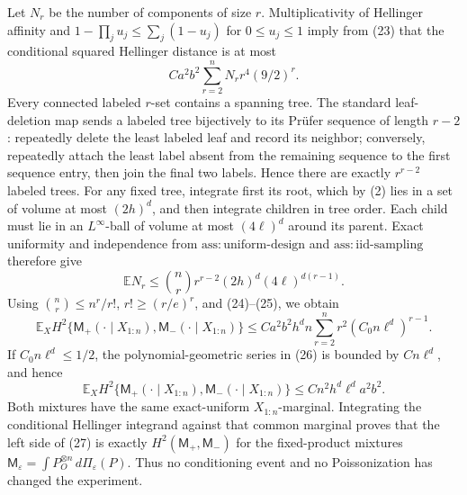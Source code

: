 Let \(N_r\) be the number of components of size \(r\).  Multiplicativity of Hellinger affinity and \(1-\prod_j u_j\le\sum_j(1-u_j)\) for \(0\le u_j\le1\) imply from (23) that the conditional squared Hellinger distance is at most
\[
 Ca^2b^2\sum_{r=2}^n N_r r^4(9/2)^r.                            \tag{24}
\]
Every connected labeled \(r\)-set contains a spanning tree.  The standard leaf-deletion map sends a labeled tree bijectively to its Pr\"ufer sequence of length \(r-2\): repeatedly delete the least labeled leaf and record its neighbor; conversely, repeatedly attach the least label absent from the remaining sequence to the first sequence entry, then join the final two labels.  Hence there are exactly \(r^{r-2}\) labeled trees.  For any fixed tree, integrate first its root, which by (2) lies in a set of volume at most \((2h)^d\), and then integrate children in tree order.  Each child must lie in an \(L^\infty\)-ball of volume at most \((4\ell)^d\) around its parent.  Exact uniformity and independence from \(\mathrm{ass:uniform\mbox{-}design}\) and \(\mathrm{ass:iid\mbox{-}sampling}\) therefore give
\[
 \mathbb E N_r
 \le {n\choose r}r^{r-2}(2h)^d(4\ell)^{d(r-1)}.                 \tag{25}
\]
Using \({n\choose r}\le n^r/r!\), \(r!\ge(r/e)^r\), and (24)--(25), we obtain
\[
 \mathbb E_XH^2\{\mathsf M_+(\cdot\mid X_{1:n}),
                         \mathsf M_-(\cdot\mid X_{1:n})\}
 \le Ca^2b^2h^dn
 \sum_{r=2}^n r^2(C_0n\ell^d)^{r-1}.                            \tag{26}
\]
If \(C_0n\ell^d\le1/2\), the polynomial-geometric series in (26) is bounded by \(C n\ell^d\), and hence
\[
 \mathbb E_XH^2\{\mathsf M_+(\cdot\mid X_{1:n}),
                         \mathsf M_-(\cdot\mid X_{1:n})\}
 \le Cn^2h^d\ell^da^2b^2.                                     \tag{27}
\]
Both mixtures have the same exact-uniform \(X_{1:n}\)-marginal.  Integrating the conditional Hellinger integrand against that common marginal proves that the left side of (27) is exactly \(H^2(\mathsf M_+,\mathsf M_-)\) for the fixed-product mixtures \(\mathsf M_\varepsilon=\int P_O^{\otimes n}\,d\Pi_\varepsilon(P)\).  Thus no conditioning event and no Poissonization has changed the experiment.

